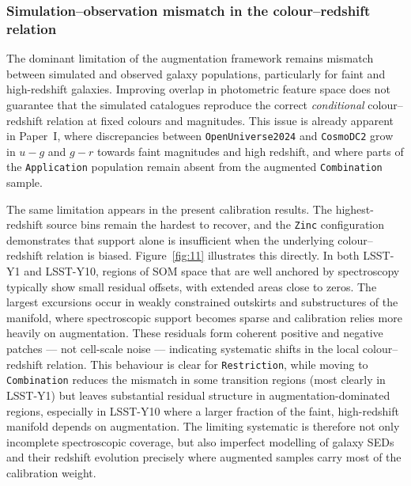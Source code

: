 \subsubsection{Simulation--observation mismatch in the colour--redshift relation} \label{sec:6.1.2}

The dominant limitation of the augmentation framework remains mismatch between simulated and observed galaxy populations, particularly for faint and high-redshift galaxies. Improving overlap in photometric feature space does not guarantee that the simulated catalogues reproduce the correct \emph{conditional} colour--redshift relation at fixed colours and magnitudes. This issue is already apparent in Paper~I, where discrepancies between \texttt{OpenUniverse2024} and \texttt{CosmoDC2} grow in \(u-g\) and \(g-r\) towards faint magnitudes and high redshift, and where parts of the \texttt{Application} population remain absent from the augmented \texttt{Combination} sample.

The same limitation appears in the present calibration results. The highest-redshift source bins remain the hardest to recover, and the \texttt{Zinc} configuration demonstrates that support alone is insufficient when the underlying colour--redshift relation is biased. Figure~\ref{fig:11} illustrates this directly. In both LSST-Y1 and LSST-Y10, regions of SOM space that are well anchored by spectroscopy typically show small residual offsets, with extended areas close to zeros. The largest excursions occur in weakly constrained outskirts and substructures of the manifold, where spectroscopic support becomes sparse and calibration relies more heavily on augmentation. These residuals form coherent positive and negative patches --- not cell-scale noise --- indicating systematic shifts in the local colour--redshift relation. This behaviour is clear for \texttt{Restriction}, while moving to \texttt{Combination} reduces the mismatch in some transition regions (most clearly in LSST-Y1) but leaves substantial residual structure in augmentation-dominated regions, especially in LSST-Y10 where a larger fraction of the faint, high-redshift manifold depends on augmentation. The limiting systematic is therefore not only incomplete spectroscopic coverage, but also imperfect modelling of galaxy SEDs and their redshift evolution precisely where augmented samples carry most of the calibration weight.

